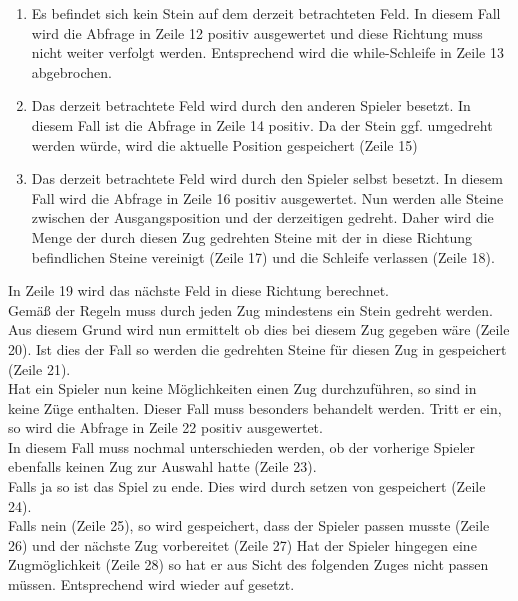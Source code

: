 \begin{enumerate}
\setcounter{enumi}{0}
\item Es befindet sich kein Stein auf dem derzeit betrachteten Feld. In diesem Fall wird die Abfrage in Zeile 12 positiv ausgewertet und diese Richtung muss nicht weiter verfolgt werden. Entsprechend wird die while-Schleife in Zeile 13 abgebrochen.
\item Das derzeit betrachtete Feld wird durch den anderen Spieler besetzt. In diesem Fall ist die Abfrage in Zeile 14 positiv. Da der Stein ggf. umgedreht werden würde, wird die aktuelle Position gespeichert (Zeile 15)
\item Das derzeit betrachtete Feld wird durch den Spieler selbst besetzt. In diesem Fall wird die Abfrage in Zeile 16 positiv ausgewertet. Nun werden alle Steine zwischen der Ausgangsposition und der derzeitigen gedreht. Daher wird die Menge der durch diesen Zug gedrehten Steine mit der in diese Richtung befindlichen Steine vereinigt (Zeile 17) und die Schleife verlassen (Zeile 18).
\end{enumerate}
In Zeile 19 wird das nächste Feld in diese Richtung berechnet.
\\Gemäß der Regeln muss durch jeden Zug mindestens ein Stein gedreht werden. Aus diesem Grund wird nun ermittelt ob dies bei diesem Zug gegeben wäre (Zeile 20). Ist dies der Fall so werden die gedrehten Steine für diesen Zug in  gespeichert (Zeile 21).
\\Hat ein Spieler nun keine Möglichkeiten einen Zug durchzuführen, so sind in  keine Züge enthalten. Dieser Fall muss besonders behandelt werden. Tritt er ein, so wird die Abfrage in Zeile 22 positiv ausgewertet.
\\In diesem Fall muss nochmal unterschieden werden, ob der vorherige Spieler ebenfalls keinen Zug zur Auswahl hatte (Zeile 23).
\\Falls ja so ist das Spiel zu ende. Dies wird durch setzen von  gespeichert (Zeile 24).
\\Falls nein (Zeile 25), so wird gespeichert, dass der Spieler passen musste (Zeile 26) und der nächste Zug vorbereitet (Zeile 27)
Hat der Spieler hingegen eine Zugmöglichkeit (Zeile 28) so hat er aus Sicht des folgenden Zuges nicht passen müssen. Entsprechend wird  wieder auf  gesetzt. 
